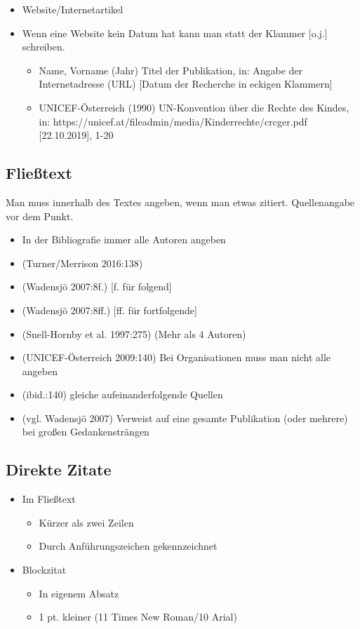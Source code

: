 \documentclass{article}
\begin{document}
\begin{itemize}
\begin{itemize}
		\end{itemize}
		\item{Website/Internetartikel}
		\item{Wenn eine Website kein Datum hat kann man statt der Klammer [o.j.] schreiben.}
		\begin{itemize}
			\item{Name, Vorname (Jahr) \glqq Titel der Publikation\grqq , in: Angabe der Internetadresse (URL) [Datum der Recherche in eckigen Klammern]}
			\item{UNICEF-Österreich (1990) \glqq UN-Konvention über die Rechte des Kindes\grqq , in: https://unicef.at/fileadmin/media/Kinderrechte/crcger.pdf [22.10.2019], 1-20}
		\end{itemize}
	\end{itemize}

	\subsection{Fließtext}
	\item{Man muss innerhalb des Textes angeben, wenn man etwas zitiert. Quellenangabe vor dem Punkt.}
	\begin{itemize}
		\item{In der Bibliografie immer alle Autoren angeben}
		\item{(Turner/Merrison 2016:138)}
		\item{(Wadensjö 2007:8f.) [f. für folgend]}
		\item{(Wadensjö 2007:8ff.) [ff. für fortfolgende]}
		\item{(Snell-Hornby et al. 1997:275) (Mehr als 4 Autoren)}
		\item{(UNICEF-Österreich 2009:140) Bei Organisationen muss man nicht alle angeben}
		\item{(ibid.:140) gleiche aufeinanderfolgende Quellen}
		\item{(vgl. Wadensjö 2007) Verweist auf eine gesamte Publikation (oder mehrere) bei großen Gedankensträngen}
	\end{itemize}

	\subsection{Direkte Zitate}
	\begin{itemize}
		\item{Im Fließtext}
		\begin{itemize}
			\item{Kürzer als zwei Zeilen}
			\item{Durch Anführungszeichen gekennzeichnet}
		\end{itemize}
		\item{Blockzitat}
		\begin{itemize}
			\item{In eigenem Absatz}
			\item{1 pt. kleiner (11 Times New Roman/10 Arial)}
		\end{itemize}
	\end{itemize}
\end{document}
